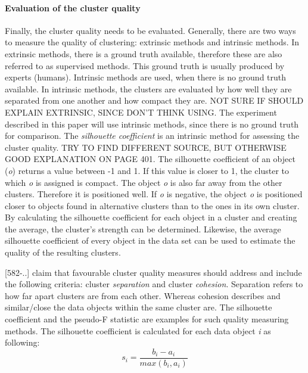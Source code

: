   \paragraph{Evaluation of the cluster quality}
  Finally, the cluster quality needs to be evaluated. Generally, there are two ways to measure the quality of clustering: extrinsic methods and intrinsic methods. In extrinsic methods, there is a ground truth available, therefore these are also referred to as supervised methods. This ground truth is usually produced by experts (humans). Intrinsic methods are used, when there is no ground truth available. In intrinsic methods, the clusters are evaluated by how well they are separated from one another and how compact they are.
  NOT SURE IF SHOULD EXPLAIN EXTRINSIC, SINCE DON'T THINK USING.
  The experiment described in this paper will use intrinsic methods, since there is no ground truth for comparison. The \textit{silhouette coefficient} is an intrinsic method for assessing the cluster quality. TRY TO FIND DIFFERENT SOURCE, BUT OTHERWISE GOOD EXPLANATION ON PAGE 401.
  The silhouette coefficient of an object (\textit{o})  returns a value between -1 and 1. If this value is closer to 1, the cluster to which \textit{o} is assigned is compact. The object \textit{o} is also far away from the other clusters. Therefore it is positioned well. If \textit{o} is negative, the object \textit{o} is positioned closer to objects found in alternative clusters than to the ones in its own cluster.
  By calculating the silhouette coefficient for each object in a cluster and creating the average, the cluster's strength can be determined. Likewise, the average silhouette coefficient of every object in the data set can be used to estimate the quality of the resulting clusters.


  \textcite{DataMiningAndPredictiveAnalytics}[582-..] claim that favourable cluster quality measures should address and include the following criteria: cluster \textit{separation} and cluster \textit{cohesion}. Separation refers to how far apart clusters are from each other. Whereas cohesion describes and similar/close the data objects within the same cluster are. The silhouette coefficient and the pseudo-F statistic are examples for such quality measuring methods. The silhouette coefficient is calculated for each data object \textit{i} as following:
  \[
    s_i = \frac{b_i - a_i}{max(b_i, a_i)}  
  \]

